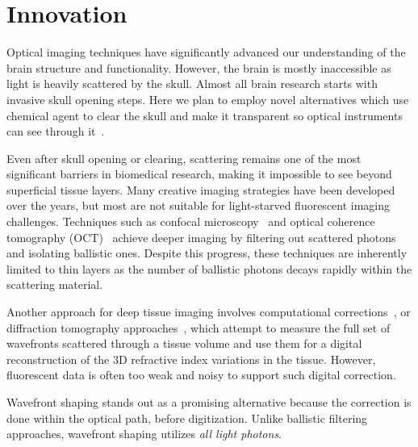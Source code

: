 \section{Innovation}

Optical imaging techniques have significantly advanced our understanding of the brain structure and functionality. However, the brain is mostly inaccessible as light is heavily scattered by the skull. Almost all brain research starts with invasive skull opening steps. Here we plan to employ novel alternatives which use chemical agent to clear the skull and make it transparent so optical instruments can see through it~\cite{Li2022TIS}. 

 Even after skull opening or clearing, scattering remains one of the most significant barriers in biomedical research, making it impossible to see beyond superficial tissue layers. Many creative imaging strategies have been developed over the years, but most are not suitable for light-starved fluorescent imaging challenges. Techniques such as confocal microscopy~\cite{ConfocalMicroscopyOverView2020} and optical coherence tomography (OCT)~\cite{OCTOverview2016} achieve deeper imaging by filtering out scattered photons and isolating ballistic ones. Despite this progress, these techniques are inherently limited to thin layers as the number of ballistic photons decays rapidly within the scattering material.

Another approach for deep tissue imaging involves computational corrections~\cite{Metzler23NeuWS,YeminyKatz2021,haim2023imageguidedcomputationalholographicwavefront,Balondrade_2024,Kang2017,Najar2024, Zhu22, Baek_2023,Jeong2018,Gil2024,Yonghyeon2022}, or diffraction tomography approaches~\cite{Kim2013,Horstmeyer:16,Chowdhury:17,Chowdhury:19,Chen:20,Zhou:20,ChoiLyers2023,liu2022recoverycontinuous3drefractive,Xue:22,he2024fluorescencediffractiontomographyusing,Kamilov:15,Sun:18,PMID:17694065,Choi2011,Choi2015,Badoneaay7170,Kwon2023,ChoiLyers2023,zhang2024deepimaginginsidescattering,Choi2023AngWavelength}, which attempt to measure the full set of wavefronts scattered through a tissue volume and use them for a digital reconstruction of the 3D refractive index variations in the tissue. However, fluorescent data is often too weak and noisy to support such digital correction.

Wavefront shaping stands out as a promising alternative because the correction is done within the optical path, before digitization. Unlike ballistic filtering approaches, wavefront shaping utilizes {\em all light photons}.
 
